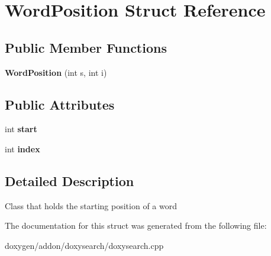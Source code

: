 \hypertarget{struct_word_position}{}\section{Word\+Position Struct Reference}
\label{struct_word_position}
\subsection*{Public Member Functions}
\begin{DoxyCompactItemize}
\item 
\mbox{\label{struct_word_position_a81483c7994f3f946f8feee24485d6e09}} 
{\bfseries Word\+Position} (int s, int i)
\end{DoxyCompactItemize}
\subsection*{Public Attributes}
\begin{DoxyCompactItemize}
\item 
\mbox{\label{struct_word_position_a497a50911b827ff10e9c7ab7ec23640d}} 
int {\bfseries start}
\item 
\mbox{\label{struct_word_position_afe4308fd431b2908e19e0ce3bf38ca03}} 
int {\bfseries index}
\end{DoxyCompactItemize}


\subsection{Detailed Description}
Class that holds the starting position of a word 

The documentation for this struct was generated from the following file\+:\begin{DoxyCompactItemize}
\item 
doxygen/addon/doxysearch/doxysearch.\+cpp\end{DoxyCompactItemize}

